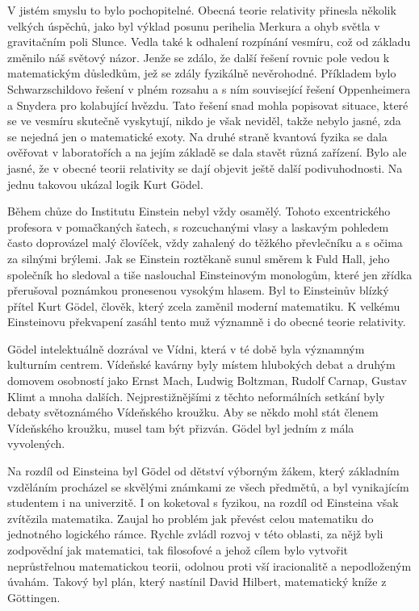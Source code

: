   V jistém smyslu to bylo pochopitelné. Obecná teorie relativity přinesla několik velkých úspěchů,
  jako byl výklad posunu perihelia Merkura a ohyb světla v gravitačním poli Slunce. Vedla také k
  odhalení rozpínání vesmíru, což od základu změnilo náš světový názor. Jenže se zdálo, že další
  řešení rovnic pole vedou k matematickým důsledkům, jež se zdály fyzikálně nevěrohodné. Příkladem
  bylo Schwarzschildovo řešení v plném rozsahu a s ním související řešení Oppenheimera a Snydera pro
  kolabující hvězdu. Tato řešení snad mohla popisovat situace, které se ve vesmíru skutečně
  vyskytují, nikdo je však neviděl, takže nebylo jasné, zda se nejedná jen o matematické exoty. Na
  druhé straně kvantová fyzika se dala ověřovat v laboratořích a na jejím základě se dala stavět
  různá zařízení. Bylo ale jasné, že v obecné teorii relativity se dají objevit ještě další
  podivuhodnosti. Na jednu takovou ukázal logik Kurt Gödel. 
  
  Během chůze do Institutu Einstein nebyl vždy osamělý. Tohoto excentrického profesora v pomačkaných
  šatech, s rozcuchanými vlasy a laskavým pohledem často doprovázel malý človíček, vždy zahalený do
  těžkého převlečníku a s očima za silnými brýlemi. Jak se Einstein roztěkaně sunul směrem k Fuld
  Hall, jeho společník ho sledoval a tiše naslouchal Einsteinovým monologům, které jen zřídka
  přerušoval poznámkou pronesenou vysokým hlasem. Byl to Einsteinův blízký přítel Kurt Gödel,
  člověk, který zcela zaměnil moderní matematiku. K velkému Einsteinovu překvapení zasáhl tento muž
  významně i do obecné teorie relativity. 
  
  Gödel intelektuálně dozrával ve Vídni, která v té době byla významným kulturním centrem. Vídeňské
  kavárny byly místem hlubokých debat a druhým domovem osobností jako Ernst Mach, Ludwig Boltzman,
  Rudolf Carnap, Gustav Klimt a mnoha dalších. Nejprestižnějšími z těchto neformálních setkání byly
  debaty světoznámého Vídeňského kroužku. Aby se někdo mohl stát členem Vídeňského kroužku, musel
  tam být přizván. Gödel byl jedním z mála vyvolených. 
  
  Na rozdíl od Einsteina byl Gödel od dětství výborným žákem, který základním vzděláním procházel se
  skvělými známkami ze všech předmětů, a byl vynikajícím studentem i na univerzitě. I on koketoval s
  fyzikou, na rozdíl od Einsteina však zvítězila matematika. Zaujal ho problém jak převést celou
  matematiku do jednotného logického rámce. Rychle zvládl rozvoj v této oblasti, za nějž byli
  zodpovědní jak matematici, tak filosofové a jehož cílem bylo vytvořit neprůstřelnou matematickou
  teorii, odolnou proti vší iracionalitě a nepodloženým úvahám. Takový byl plán, který nastínil
  David Hilbert, matematický kníže z Göttingen. 
  
